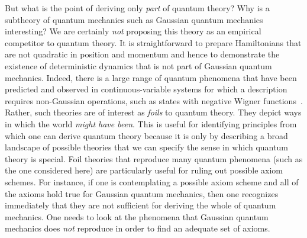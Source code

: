 \documentclass[pra,superscriptaddress,nofootinbib,12pt]{revtex4-2}
\begin{document}
But what is the point of deriving only \emph{part} of quantum theory?  Why is a subtheory of quantum mechanics such as Gaussian quantum mechanics interesting?  We are certainly \emph{not} proposing this theory as an empirical competitor to quantum theory.  It is straightforward to prepare Hamiltonians that are not quadratic in position and momentum and hence to demonstrate the existence of deterministic dynamics that is not part of Gaussian quantum mechanics.
Indeed, there is a large range of quantum phenomena that have been predicted and observed in continuous-variable systems for which a description requires non-Gaussian operations, such as states with negative Wigner functions~\cite{GrangierNWF1,GrangierNWF2,GrangierNWF3,GrangierNWF4,Laiho}.  Rather, such theories are of interest as \emph{foils} to quantum theory.  They depict ways in which the world \emph{might have been}.  This is useful for identifying principles from which one can derive quantum theory because it is only by describing a broad landscape of possible theories that we can specify the sense in which quantum theory is special.
Foil theories that reproduce many quantum phenomena (such as the one considered here) are particularly useful for ruling out possible axiom schemes.  For instance, if one is contemplating a possible axiom scheme and all of the axioms hold true for Gaussian quantum mechanics, then one recognizes immediately that they are not sufficient for deriving the whole of quantum mechanics.  One needs to look at the phenomena that Gaussian quantum mechanics does \emph{not} reproduce in order to find an adequate set of axioms.
\end{document}
